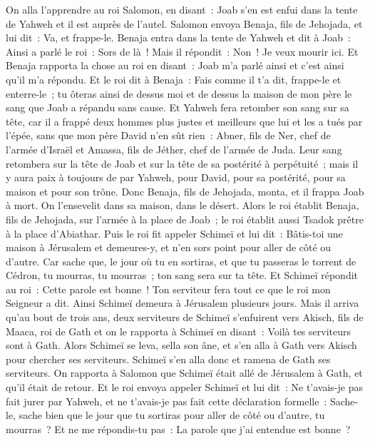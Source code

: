 \begin{multicols}{2}
On alla l'apprendre au roi Salomon, en disant~: Joab s'en est enfui dans la tente de Yahweh et il est auprès de l'autel. Salomon envoya Benaja, fils de Jehojada, et lui dit~: Va, et frappe-le.
Benaja entra dans la tente de Yahweh et dit à Joab~: Ainsi a parlé le roi~: Sors de là~! Mais il répondit~: Non~! Je veux mourir ici. Et Benaja rapporta la chose au roi en disant~: Joab m'a parlé ainsi et c'est ainsi qu'il m'a répondu.
Et le roi dit à Benaja~: Fais comme il t'a dit, frappe-le et enterre-le~; tu ôteras ainsi de dessus moi et de dessus la maison de mon père le sang que Joab a répandu sans cause.
Et Yahweh fera retomber son sang sur sa tête, car il a frappé deux hommes plus justes et meilleurs que lui et les a tués par l'épée, sans que mon père David n'en sût rien~: Abner, fils de Ner, chef de l'armée d'Israël et Amassa, fils de Jéther, chef de l'armée de Juda.
Leur sang retombera sur la tête de Joab et sur la tête de sa postérité à perpétuité~; mais il y aura paix à toujours de par Yahweh, pour David, pour sa postérité, pour sa maison et pour son trône.
Donc Benaja, fils de Jehojada, monta, et il frappa Joab à mort. On l'ensevelit dans sa maison, dans le désert.
Alors le roi établit Benaja, fils de Jehojada, sur l'armée à la place de Joab~; le roi établit aussi Tsadok prêtre à la place d'Abiathar.
Puis le roi fit appeler Schimeï et lui dit~: Bâtis-toi une maison à Jérusalem et demeures-y, et n'en sors point pour aller de côté ou d'autre.
Car sache que, le jour où tu en sortiras, et que tu passeras le torrent de Cédron, tu mourras, tu mourras~; ton sang sera sur ta tête.
Et Schimeï répondit au roi~: Cette parole est bonne~! Ton serviteur fera tout ce que le roi mon Seigneur a dit. Ainsi Schimeï demeura à Jérusalem plusieurs jours.
Mais il arriva qu'au bout de trois ans, deux serviteurs de Schimeï s'enfuirent vers Akisch, fils de Maaca, roi de Gath et on le rapporta à Schimeï en disant~: Voilà tes serviteurs sont à Gath.
Alors Schimeï se leva, sella son âne, et s'en alla à Gath vers Akisch pour chercher ses serviteurs. Schimeï s'en alla donc et ramena de Gath ses serviteurs.
On rapporta à Salomon que Schimeï était allé de Jérusalem à Gath, et qu'il était de retour.
Et le roi envoya appeler Schimeï et lui dit~: Ne t'avais-je pas fait jurer par Yahweh, et ne t'avais-je pas fait cette déclaration formelle~: Sache-le, sache bien que le jour que tu sortiras pour aller de côté ou d'autre, tu mourras~? Et ne me répondis-tu pas~: La parole que j'ai entendue est bonne~?

\end{multicols}

